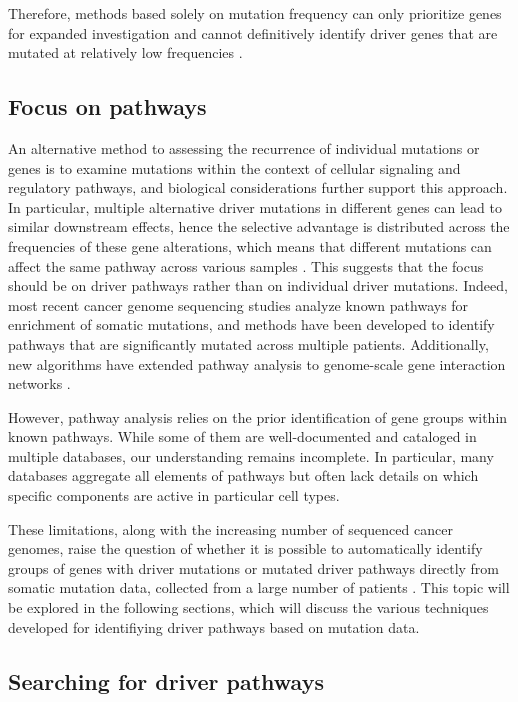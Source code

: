 Therefore, methods based solely on mutation frequency can only prioritize genes for expanded investigation and cannot definitively identify driver genes that are mutated at relatively low frequencies \cite{vogelstein2013}.

\subsection{Focus on pathways}

An alternative method to assessing the recurrence of individual mutations or genes is to examine mutations within the context of cellular signaling and regulatory pathways, and biological considerations further support this approach. In particular, multiple alternative driver mutations in different genes can lead to similar downstream effects, hence the selective advantage is distributed across the frequencies of these gene alterations, which means that different mutations can affect the same pathway across various samples \cite{mutex, multi-dendrix}. This suggests that the focus should be on driver pathways rather than on individual driver mutations. Indeed, most recent cancer genome sequencing studies analyze known pathways for enrichment of somatic mutations, and methods have been developed to identify pathways that are significantly mutated across multiple patients. Additionally, new algorithms have extended pathway analysis to genome-scale gene interaction networks \cite{dendrix}.

However, pathway analysis relies on the prior identification of gene groups within known pathways. While some of them are well-documented and cataloged in multiple databases, our understanding remains incomplete. In particular, many databases aggregate all elements of pathways but often lack details on which specific components are active in particular cell types.

These limitations, along with the increasing number of sequenced cancer genomes, raise the question of whether it is possible to automatically identify groups of genes with driver mutations or mutated driver pathways directly from somatic mutation data, collected from a large number of patients \cite{dendrix}. This topic will be explored in the following sections, which will discuss the various techniques developed for identifiying driver pathways based on mutation data.

\subsection{Searching for driver pathways}

